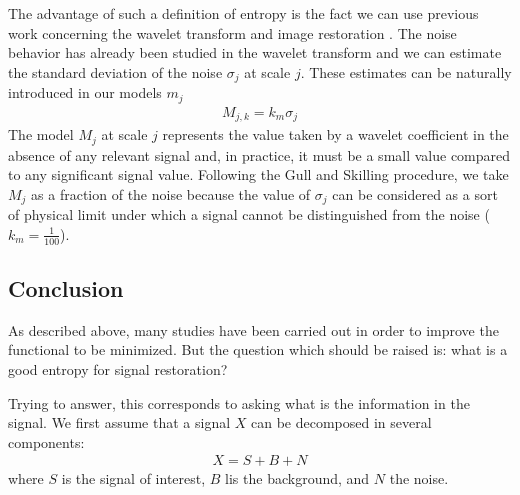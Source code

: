 The advantage of such a definition of entropy is
 the fact we can use previous work concerning the wavelet transform and
image restoration \cite{starck:mur95_2,starck:sta94_1,starck:sta94_4}. 
The noise behavior has already been studied in the wavelet transform 
and we can estimate the standard deviation of the noise $\sigma_j$ 
at scale $j$. These estimates can be naturally introduced in our 
models $m_j$
\begin{eqnarray}
M_{j,k} = k_{m} \sigma_j
\end{eqnarray}
 The model $M_j$ at scale $j$ represents 
the value taken by a wavelet coefficient in the absence of any relevant
 signal and, in  practice, it must be a small value compared to 
any significant signal value.
Following the Gull and Skilling procedure, we take $M_j$ as a fraction of the 
noise because the value of 
$\sigma_j$ can be considered as a sort of physical limit under which a signal 
cannot be distinguished from the noise ($k_m = \frac{1}{100}$).

\subsection{Conclusion}
\label{sect_5pt}

As described above, many studies   
have been carried out in order to improve the functional to be minimized.
But the question which should be raised is: what is a good entropy for 
signal restoration?

Trying to answer, this corresponds to asking what is the information
in the signal. We first assume that a signal $X$ can be decomposed in
several components:
\begin{eqnarray}
 X = S + B + N
\end{eqnarray}
where $S$ is the signal of interest, $B$ lis the background, and $N$  the noise.

